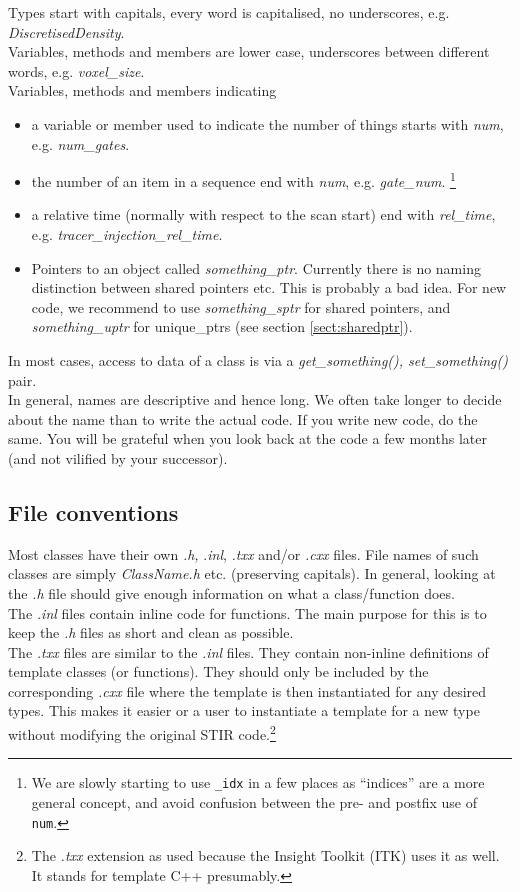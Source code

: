 \documentclass{article}
\begin{document}
Types start with capitals, every word is capitalised, no underscores, 
e.g. \textit{DiscretisedDensity}.\\
Variables, methods and members are lower case, underscores between 
different words, e.g. \textit{voxel\_size}.\\
Variables, methods and members indicating 
\begin{itemize}
\item 
a variable or member used to indicate the number of things starts 
with \textit{num}, e.g. \textit{num\_gates}.
\item 
the number of an item in a sequence end with \textit{num}, e.g. \textit{gate\_num}.
\footnote{We are slowly starting to use \texttt{\_idx} in a few places as ``indices'' are a more general concept, and avoid confusion between the pre- and postfix use of \texttt{num}.}
\item 
a relative time (normally with respect to the scan start) end 
with \textit{rel\_time}, e.g. \textit{tracer\_injection\_rel\_time}.
\item 
Pointers to an object called \textit{something\_ptr}. Currently there 
is no naming distinction between shared pointers etc. This is 
probably a bad idea. For new code, we recommend to use \textit{something\_sptr} 
for shared pointers, and \textit{something\_uptr} for unique\_ptrs (see 
section \ref{sect:sharedptr}).
\end{itemize}

In most cases, access to data of a class is via a \textit{get\_something(), 
set\_something()} pair.\\
In general, names are descriptive and hence long. We often take 
longer to decide about the name than to write the actual code. 
If you write new code, do the same. You will be grateful when 
you look back at the code a few months later (and not vilified 
by your successor). 

\subsection{
File conventions }

Most classes have their own \textit{.h,} .\textit{inl}, \textit{.txx} and/or \textit{.cxx} files. 
File names of such classes are simply \textit{ClassName.h} {\nobreakspace}etc. 
(preserving capitals). In general, looking at 
the \textit{.h} file should give enough information on what a class/function 
does. \\
The \textit{.inl} files contain inline code 
for functions. The main purpose for this is to keep the \textit{.h} 
files as short and clean as possible. \\
The \textit{.txx} files are similar to the \textit{.inl} files. They contain non-inline 
definitions of template classes (or functions). They should only be included by the
corresponding \textit{.cxx} file where the template is then instantiated for any desired types.
This makes it easier or a user to instantiate a template for a new type without modifying the
original STIR code.\footnote{The \textit{.txx} extension as used because the Insight Toolkit (ITK) 
uses it as well. It stands for template C++ presumably.}
\end{document}
